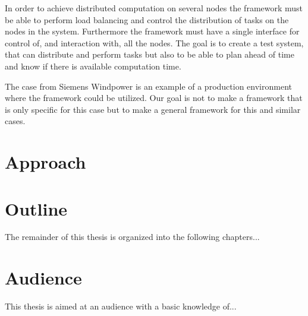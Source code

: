 In order to achieve distributed computation on several nodes the framework must be able to perform load balancing and control the distribution of tasks on the nodes in the system. 
Furthermore the framework must have a single interface for control of, and interaction with, all the nodes.  
The goal is to create a test system, that can distribute and perform tasks but also to be able to plan ahead of time and know if there is available computation time.

The case from Siemens Windpower is an example of a production environment where the framework could be utilized. 
Our goal is not to make a framework that is only  specific for this case but to make a general framework for this and similar cases.

\section{Approach}

\section{Outline}
The remainder of this thesis is organized into the following chapters...

\section{Audience}
This thesis is aimed at an audience with a basic knowledge of...
